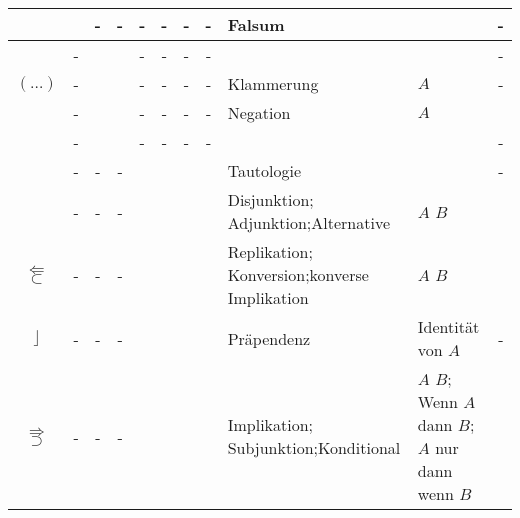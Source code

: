 \begin{table}[p]
\begin{threeparttable}
\begin{tabularx}{\linewidth}{|c||c:cc:cccc|X:X|c|}
			\tableline%
			& \textfalse & - & - & - & - & - & -
			& Falsum
			&  & - \\
			\hline\hline%
			& - & \texttrue & \texttrue  & - & - & - & - & & & - \\
			\tableline%
			$(\dots)$
			& - & \texttrue & \textfalse & - & - & - & -
			& Klammerung
			& $A$  & - \\
			\tableline%
			& - & \textfalse & \texttrue  & - & - & - & -
			& Negation
			&  $A$ & \thepnot{} \\
			\tableline%
			& - & \textfalse & \textfalse & - & - & - & - & & & -  \\
			\hline\hline%
			& - & - & - &\texttrue&\texttrue&\texttrue&\texttrue
			& Tautologie
			& & - \\
			\tableline%
			\defSym{\OjkOr}
			& - & - & - &\texttrue&\texttrue&\texttrue&\textfalse
			& Disjunktion; Adjunktion;\newline Alternative
			& $A$  $B$ & \thepor \\
			\tableline%
			 $\Leftarrow$ $\subset$
			& - & - & - &\texttrue&\texttrue&\textfalse&\texttrue
			& Replikation; Konversion;\newline konverse Implikation
			& $A$  $B$ & \theprep \\
			\tableline%
			$\rfloor$
			& - & - & - &\texttrue&\texttrue&\textfalse&\textfalse
			& Präpendenz
			& Identität von $A$ & - \\
			\tablegroup%
			 $\Rightarrow$ $\supset$
			& - & - & - &\texttrue&\textfalse&\texttrue&\texttrue
			& Implikation; Subjunktion;\newline Konditional
			&  $A$  $B$; Wenn $A$ dann $B$;\newline
			$A$ nur dann wenn $B$ & \thepimp \\

\end{tabularx}
\end{threeparttable}
\end{table}
